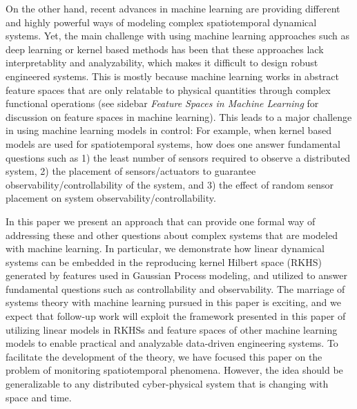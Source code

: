 On the other hand, recent advances in machine learning are providing different and highly powerful ways of modeling complex spatiotemporal dynamical systems.  %
Yet, the main challenge with using machine learning approaches such as deep learning or kernel based methods has been that these approaches lack interpretablity and analyzability, which makes it difficult to design robust engineered systems. This is mostly because machine learning works in abstract feature spaces that are only relatable to physical quantities through complex functional operations (see sidebar \emph{Feature Spaces in Machine Learning} for discussion on feature spaces in machine learning). This leads to a major challenge in using machine learning models in control: For example, when kernel based models are used for spatiotemporal systems, how does one answer fundamental questions such as 1) the least number of sensors required to observe a distributed system, 2) the placement of sensors/actuators to guarantee observability/controllability of the system, and 3) the effect of random sensor placement on system observability/controllability.

In this paper we present an approach that can provide one formal way of addressing these and other questions about complex systems that are modeled with machine learning. In particular, we demonstrate how linear dynamical systems can be embedded in the reproducing kernel Hilbert space (RKHS) \cite{schoelkopf01kernelbased,ams:cucker,kingravi2012reproducing} generated by features used in Gaussian Process modeling, %
and utilized to answer fundamental questions such as controllability and observability. The marriage of systems theory with machine learning pursued in this paper is exciting, and %
 we expect that follow-up work will exploit the framework presented in this paper of utilizing linear models in RKHSs and feature spaces of other machine learning models to enable practical and analyzable data-driven engineering systems. To facilitate the development of the theory, we have focused this paper on the problem of monitoring spatiotemporal phenomena. However, the idea should be generalizable to any distributed cyber-physical system that is changing with space and time. %

